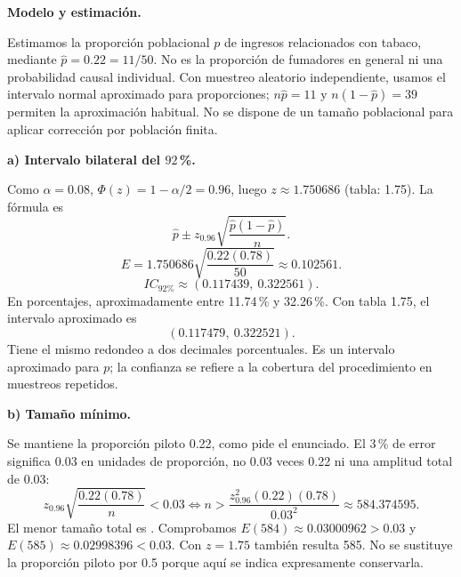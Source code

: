 \textbf{Modelo y estimación.}\par\nopagebreak[4]
Estimamos la proporción poblacional $p$ de ingresos relacionados con tabaco, mediante $\widehat p=0.22=11/50$. No es la proporción de fumadores en general ni una probabilidad causal individual. Con muestreo aleatorio independiente, usamos el intervalo normal aproximado para proporciones; $n\widehat p=11$ y $n(1-\widehat p)=39$ permiten la aproximación habitual. No se dispone de un tamaño poblacional para aplicar corrección por población finita.

\textbf{a) Intervalo bilateral del $92$\,\%.}\par\nopagebreak[4]
Como $\alpha=0.08$, $\Phi(z)=1-\alpha/2=0.96$, luego $z\approx1.750686$ (tabla: 1.75). La fórmula es
\[
\widehat p\pm z_{0.96}\sqrt{\frac{\widehat p(1-\widehat p)}{n}}.
\]
\[
E=1.750686\sqrt{\frac{0.22(0.78)}{50}}\approx0.102561.
\]
\[\boxed{IC_{\text{92\%}}\approx(0.117439,\ 0.322561)}.
\]
En porcentajes, aproximadamente entre 11.74\,\% y 32.26\,\%. Con tabla 1.75, el intervalo aproximado es
\[(0.117479,\ 0.322521).\]
Tiene el mismo redondeo a dos decimales porcentuales. Es un intervalo aproximado para $p$; la confianza se refiere a la cobertura del procedimiento en muestreos repetidos.

\textbf{b) Tamaño mínimo.}\par\nopagebreak[4]
Se mantiene la proporción piloto 0.22, como pide el enunciado. El 3\,\% de error significa 0.03 en unidades de proporción, no 0.03 veces 0.22 ni una amplitud total de 0.03:
\[
z_{0.96}\sqrt{\frac{0.22(0.78)}n}<0.03
\iff n>\frac{z_{0.96}^2(0.22)(0.78)}{0.03^2}
\approx584.374595.
\]
El menor tamaño total es . Comprobamos $E(584)\approx0.03000962>0.03$ y $E(585)\approx0.02998396<0.03$. Con $z=1.75$ también resulta 585. No se sustituye la proporción piloto por 0.5 porque aquí se indica expresamente conservarla.
